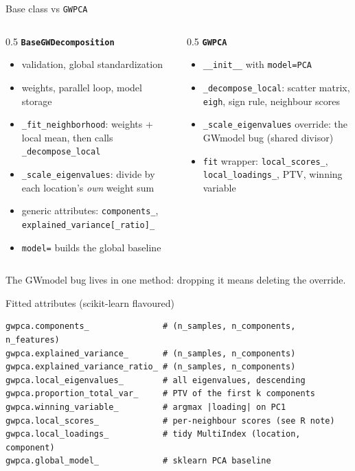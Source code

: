 \documentclass[10pt]{beamer}
\begin{document}
\begin{frame}{Base class vs \texttt{GWPCA}}
  \begin{columns}[T]
    \begin{column}{0.5\textwidth}
      \textbf{\texttt{BaseGWDecomposition}}
      \begin{itemize}\small
        \item validation, global standardization
        \item weights, parallel loop, model storage
        \item \texttt{\_fit\_neighborhood}: weights + local mean, then calls
          \texttt{\_decompose\_local}
        \item \texttt{\_scale\_eigenvalues}: divide by each location's
          \emph{own} weight sum
        \item generic attributes: \texttt{components\_},
          \texttt{explained\_variance[\_ratio]\_}
        \item \texttt{model=} builds the global baseline
      \end{itemize}
    \end{column}
    \begin{column}{0.5\textwidth}
      \textbf{\texttt{GWPCA}}
      \begin{itemize}\small
        \item \texttt{\_\_init\_\_} with \texttt{model=PCA}
        \item \texttt{\_decompose\_local}: scatter matrix, \texttt{eigh},
          sign rule, neighbour scores
        \item \texttt{\_scale\_eigenvalues} override: the GWmodel bug
          (shared divisor)
        \item \texttt{fit} wrapper: \texttt{local\_scores\_},
          \texttt{local\_loadings\_}, PTV, winning variable
      \end{itemize}
    \end{column}
  \end{columns}
  \vfill
  \centering
  \footnotesize The GWmodel bug lives in one method: dropping it means
  deleting the override.
\end{frame}

\begin{frame}[fragile]{Fitted attributes (scikit-learn flavoured)}
\begin{lstlisting}
gwpca.components_               # (n_samples, n_components, n_features)
gwpca.explained_variance_       # (n_samples, n_components)
gwpca.explained_variance_ratio_ # (n_samples, n_components)
gwpca.local_eigenvalues_        # all eigenvalues, descending
gwpca.proportion_total_var_     # PTV of the first k components
gwpca.winning_variable_         # argmax |loading| on PC1
gwpca.local_scores_             # per-neighbour scores (see R note)
gwpca.local_loadings_           # tidy MultiIndex (location, component)
gwpca.global_model_             # sklearn PCA baseline
\end{lstlisting}
\end{frame}
\end{document}
